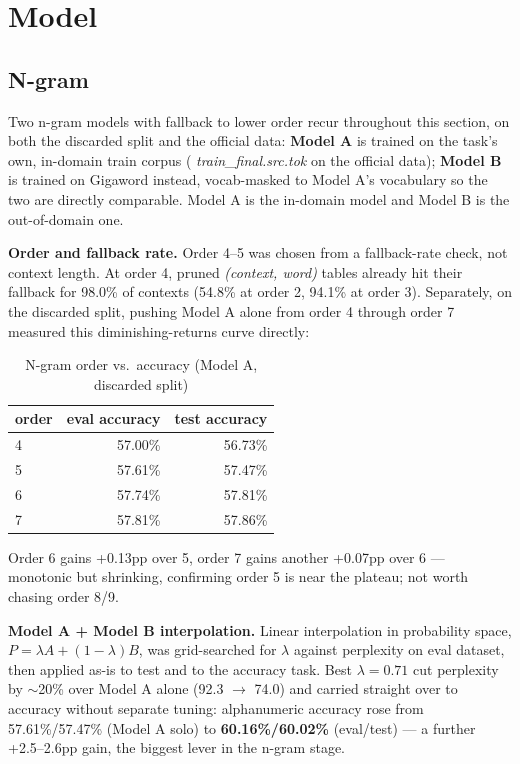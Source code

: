 \documentclass[11pt,conference]{IEEEtran}
\newcommand{\code}[1]{\textit{#1}}
\begin{document}
\section{Model}

\subsection{N-gram}
\label{sec:ngram}

Two n-gram models with fallback to lower order recur throughout this section, on both the discarded split
and the official data: \textbf{Model A} is trained on the task's own,
in-domain train corpus (
\code{train\_final.src.tok} on the official data); \textbf{Model B} is
trained on Gigaword instead, vocab-masked to Model A's vocabulary so the two
are directly comparable. Model A is the in-domain model and Model B is the
out-of-domain one.

\textbf{Order and fallback rate.} Order 4--5 was chosen from a fallback-rate
check, not context length. At order 4, pruned \code{(context, word)} tables
already hit their fallback for 98.0\% of
contexts (54.8\% at order 2, 94.1\% at order 3). Separately, on the discarded
split, pushing Model A alone from order 4 through order 7 measured this
diminishing-returns curve directly:

\begin{table}[h]
\centering
\caption{N-gram order vs.\ accuracy (Model A, discarded split)}
\label{tab:order}
\begin{tabular}{lrr}
\toprule
order & eval accuracy & test accuracy \\
\midrule
4 & 57.00\% & 56.73\% \\
5 & 57.61\% & 57.47\% \\
6 & 57.74\% & 57.81\% \\
7 & 57.81\% & 57.86\% \\
\bottomrule
\end{tabular}
\end{table}

Order 6 gains +0.13pp over 5, order 7 gains another +0.07pp over 6 ---
monotonic but shrinking, confirming order 5 is near the plateau; not worth
chasing order 8/9.

\textbf{Model A + Model B interpolation.} Linear
interpolation in probability space, $P = \lambda A +
(1-\lambda) B$, was grid-searched for $\lambda$ against
perplexity on eval dataset, then applied as-is to test and to the accuracy task. Best
$\lambda=0.71$ cut perplexity by $\sim$20\% over Model A alone (92.3
$\rightarrow$ 74.0) and carried straight over to accuracy without separate
tuning: alphanumeric accuracy rose from 57.61\%/57.47\% (Model A solo) to
\textbf{60.16\%/60.02\%} (eval/test) --- a further +2.5--2.6pp gain, the
biggest lever in the n-gram stage.
\end{document}
